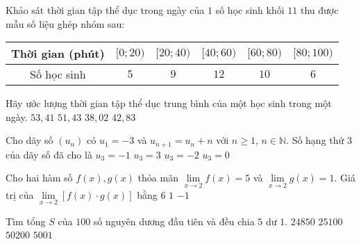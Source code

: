 \begin{ex}%
Khảo sát thời gian tập thể dục trong ngày của $1$ số học sinh khối $11$ thu được mẫu số liệu ghép nhóm sau:
\begin{longtable}{|c|c|c|c|c|c|}
\hline
Thời gian (phút) & $[0;20)$ & $[20;40)$ & $[40;60)$ & $[60;80)$ & $[80;100)$\\
\hline
Số học sinh & $5$ & $9$ & $12$ & $10$ & $6$\\
\hline
\end{longtable}
Hãy ước lượng thời gian tập thể dục trung bình của một học sinh trong một ngày.
\choice
{$53{,}41$}
{\True $51{,}43$}
{$38{,}02$}
{$42{,}83$}
\end{ex}

\begin{ex}%
Cho dãy số $(u_n)$ có $u_1=-3$ và $u_{n+1}=u_n+n$ với $n\ge 1$, $n\in \mathbb{N}$. Số hạng thứ $3$ của dãy số đã cho là
\choice
{$u_3=-1$}
{$u_3=3$}
{$u_3=-2$}
{\True $u_3=0$}
\end{ex}

\begin{ex}%
Cho hai hàm số $f\left(x\right),g\left(x\right)$ thỏa mãn ${\mathop{\lim}\limits_{x\to 2}} f\left(x\right)=5$ và ${\mathop{\lim}\limits_{x\to 2}} g\left(x\right)=1$. Giá trị của ${\mathop{\lim}\limits_{x\to 2}} \left[f\left(x\right)\cdot g\left(x\right)\right]$ bằng
{$6$}
{$1$}
{$-1$}
\end{ex}

\begin{ex}%
Tìm tổng $S$ của $100$ số nguyên dương đầu tiên và đều chia $5$ dư $1$.
\choice
{\True $24850$ }
{ $25100$ }
{ $50200$ }
{ $5001$ }
\end{ex}

